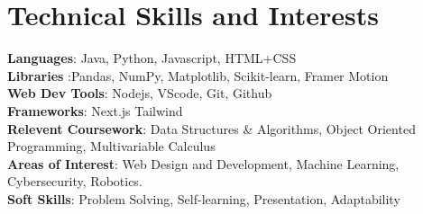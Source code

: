 \documentclass[a4paper,11pt]{article}
\begin{document}
\section{\textbf{Technical Skills and Interests}}
 \begin{itemize}[leftmargin=0.05in, label={}]
    \small{\item{
     \textbf{Languages}{: Java, Python, Javascript, HTML+CSS } \\
     \textbf{Libraries }{:Pandas, NumPy, Matplotlib, Scikit-learn, Framer Motion }\\ 
     \textbf{Web Dev Tools}{: Nodejs, VScode, Git, Github } \\ 
     \textbf{Frameworks}{: Next.js Tailwind } \\  
      \textbf{Relevent Coursework}{: Data Structures \& Algorithms, Object Oriented Programming, Multivariable Calculus } \\ 
     \textbf{Areas of Interest}{: Web Design and Development, Machine Learning, Cybersecurity, Robotics.} \\
     \textbf{Soft Skills}{: Problem Solving, Self-learning, Presentation, Adaptability} \\
    }}
 \end{itemize}
 \vspace{-16pt}
\end{document}
